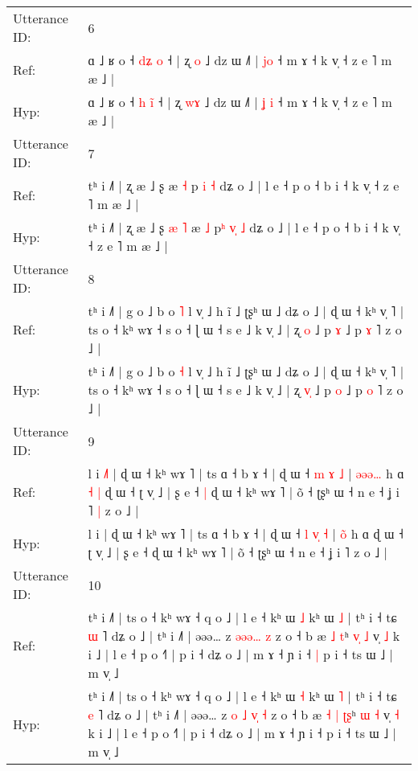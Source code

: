 \documentclass[10pt]{article}
\DeclareRobustCommand{\hl}[1]{{\textcolor{red}{#1}}}
\begin{document}
\begin{longtable}{ll}
 \\
\midrule
Utterance ID: & 6 \\
Ref: & ɑ ˩ ʁ o ˧ \hl{d}\hl{ʑ}\hl{ }\hl{o} ˧ | ʐ \hl{}\hl{o} ˩ dz ɯ ˩˥ | \hl{}\hl{j}\hl{o} ˧ m ɤ ˧ k v̩ ˧ z e ˥ m æ ˩ |
 \\
Hyp: & ɑ ˩ ʁ o ˧ \hl{h}\hl{ }\hl{i}\hl{̃} ˧ | ʐ \hl{w}\hl{ɤ} ˩ dz ɯ ˩˥ | \hl{ʝ}\hl{ }\hl{i} ˧ m ɤ ˧ k v̩ ˧ z e ˥ m æ ˩ |
 \\
\midrule
Utterance ID: & 7 \\
Ref: & tʰ i ˩˥ | ʐ æ ˩ ʂ\hl{}\hl{}\hl{}\hl{} æ \hl{˧} p\hl{} \hl{}\hl{i} \hl{˧} dʑ o ˩ | l e ˧ p o ˧ b i ˧ k v̩ ˧ z e ˥ m æ ˩ |
 \\
Hyp: & tʰ i ˩˥ | ʐ æ ˩ ʂ\hl{ }\hl{æ}\hl{ }\hl{˥} æ \hl{˩} p\hl{ʰ} \hl{v}\hl{̩} \hl{˩} dʑ o ˩ | l e ˧ p o ˧ b i ˧ k v̩ ˧ z e ˥ m æ ˩ |
 \\
\midrule
Utterance ID: & 8 \\
Ref: & tʰ i ˩˥ | g o ˩ b o \hl{˥} l v̩ ˩ h ĩ ˩ ʈʂʰ ɯ ˩ dʑ o ˩ | ɖ ɯ ˧ kʰ v̩ ˥ | ts o ˧ kʰ wɤ ˧ s o ˧ ɭ ɯ ˧ s e ˩ k v̩ ˩ | ʐ \hl{}\hl{o} ˩ p \hl{ɤ} ˩ p \hl{ɤ} ˥ z o ˩ |
 \\
Hyp: & tʰ i ˩˥ | g o ˩ b o \hl{˧} l v̩ ˩ h ĩ ˩ ʈʂʰ ɯ ˩ dʑ o ˩ | ɖ ɯ ˧ kʰ v̩ ˥ | ts o ˧ kʰ wɤ ˧ s o ˧ ɭ ɯ ˧ s e ˩ k v̩ ˩ | ʐ \hl{v}\hl{̩} ˩ p \hl{o} ˩ p \hl{o} ˥ z o ˩ |
 \\
\midrule
Utterance ID: & 9 \\
Ref: & l i\hl{ }\hl{˩}\hl{˥} | ɖ ɯ ˧ kʰ wɤ ˥ | ts ɑ ˧ b ɤ ˧ | ɖ ɯ ˧ \hl{m} \hl{}\hl{ɤ} \hl{˩} | \hl{ə}\hl{ə}\hl{ə}\hl{…} h ɑ\hl{ }\hl{˧}\hl{ }\hl{|} ɖ ɯ ˧ ʈ v̩ ˩ | ʂ e ˧\hl{ }\hl{|} ɖ ɯ ˧ kʰ wɤ ˥ | õ ˧ ʈʂʰ ɯ ˧ n e ˧ ʝ i ˥\hl{ }\hl{|} z o ˩ |
 \\
Hyp: & l i\hl{}\hl{}\hl{} | ɖ ɯ ˧ kʰ wɤ ˥ | ts ɑ ˧ b ɤ ˧ | ɖ ɯ ˧ \hl{l} \hl{v}\hl{̩} \hl{˧} | \hl{}\hl{}\hl{o}\hl{̃} h ɑ\hl{}\hl{}\hl{}\hl{} ɖ ɯ ˧ ʈ v̩ ˩ | ʂ e ˧\hl{}\hl{} ɖ ɯ ˧ kʰ wɤ ˥ | õ ˧ ʈʂʰ ɯ ˧ n e ˧ ʝ i ˥\hl{}\hl{} z o ˩ |
 \\
\midrule
Utterance ID: & 10 \\
Ref: & tʰ i ˩˥ | ts o ˧ kʰ wɤ ˧ q o ˩ | l e ˧ kʰ ɯ \hl{˩} kʰ ɯ \hl{˩} | tʰ i ˧ tɕ \hl{ɯ} ˥ dʑ o ˩ | tʰ i ˩˥ | əəə… z\hl{}\hl{} \hl{ə}\hl{ə}\hl{ə}\hl{…} \hl{z} z o ˧ b æ\hl{}\hl{} \hl{˩} \hl{}\hl{t}ʰ \hl{v}\hl{̩} \hl{˩} v̩ \hl{˩} k i ˩ | l e ˧ p o ˧˥ | p i ˧ dʑ o ˩ | m ɤ ˧ ɲ i ˧\hl{ }\hl{|} p i ˧ ts ɯ ˩ | m v̩ ˩
 \\
Hyp: & tʰ i ˩˥ | ts o ˧ kʰ wɤ ˧ q o ˩ | l e ˧ kʰ ɯ \hl{˧} kʰ ɯ \hl{˥} | tʰ i ˧ tɕ \hl{e} ˥ dʑ o ˩ | tʰ i ˩˥ | əəə… z\hl{ }\hl{o} \hl{˩}\hl{ }\hl{v}\hl{̩} \hl{˧} z o ˧ b æ\hl{ }\hl{˧} \hl{|} \hl{ʈ}\hl{ʂ}ʰ \hl{}\hl{ɯ} \hl{˧} v̩ \hl{˧} k i ˩ | l e ˧ p o ˧˥ | p i ˧ dʑ o ˩ | m ɤ ˧ ɲ i ˧\hl{}\hl{} p i ˧ ts ɯ ˩ | m v̩ ˩

\end{longtable}
\end{document}
